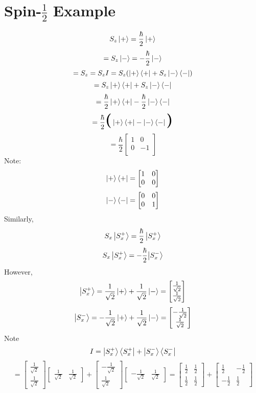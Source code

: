 \documentclass{book}
\begin{document}
\section{Spin-$\frac{1}{2}$ Example}
$$ S_z \ket{+} = \frac{\hbar}{2} \ket{+} $$
$$=  S_z \ket{-} = - \frac{\hbar}{2} \ket{-} $$
$$= S_z = S_z I = S_z (\ket{+}\bra{+} + S_z \ket{-}\bra{-}) $$
$$= S_z \ket{+} \bra{+} + S_z \ket {-} \bra{-} $$
$$= \frac{\hbar}{2} \ket{+}\bra{+} - \frac{\hbar}{2} \ket{-}\bra{-}$$
$$= \frac{\hbar}{2} \textbf{\huge (} \ket{+}\bra{+}  -  \ket{-}\bra{-} \textbf{\huge)}$$
$$= \frac{\hbar}{2} \begin{bmatrix}
 1 & 0 \\
 0 & -1 \\
\end{bmatrix}
$$
Note:
$$ \ket{+} \bra{+} = \begin{bmatrix}
 1 & 0 \\ 0 & 0
\end{bmatrix} $$
$$ \ket{-} \bra{-} = \begin{bmatrix}
 0 & 0 \\ 0 & 1
\end{bmatrix} $$
Similarly, 
$$ S_x \ket{S_x^+} = \frac{\hbar}{2}\ket{S_x^+} $$
$$ S_x \ket{S_x^+} = - \frac{\hbar}{2}{\ket{S_x^-}} $$
However, 
$$\ket{S_x^+} = \frac{1}{\sqrt{2}} \ket{+} + \frac{1}{\sqrt{2}} \ket{-} = \begin{bmatrix}
\frac{1}{\sqrt{2}} \\ \frac{1}{\sqrt{2}}
\end{bmatrix}$$
$$\ket{S_x^-} =- \frac{1}{\sqrt{2}} \ket{+} + \frac{1}{\sqrt{2}} \ket{-} = \begin{bmatrix}
- \frac{1}{\sqrt{2}} \\ \frac{1}{\sqrt{2}}
\end{bmatrix}$$
Note
$$ I = \ket{S_x^+} \bra{S_x^+} + \ket{S_x^-}\bra{S_x^-}$$
$$ = \begin{bmatrix}
  \frac{1}{\sqrt{2}} \\ \frac{1}{\sqrt{2}}
\end{bmatrix}
\begin{bmatrix}
  \frac{1}{\sqrt{2}} & \frac{1}{\sqrt{2}}
\end{bmatrix} +
 \begin{bmatrix}
  - \frac{1}{\sqrt{2}} \\ \frac{1}{\sqrt{2}}
\end{bmatrix}
\begin{bmatrix}
  - \frac{1}{\sqrt{2}} & \frac{1}{\sqrt{2}}
\end{bmatrix} = 
\begin{bmatrix}
  \frac{1}{2} &  \frac{1}{2} \\
   \frac{1}{2} &  \frac{1}{2}
\end{bmatrix} + 
\begin{bmatrix}
   \frac{1}{2} & - \frac{1}{2} \\
   -  \frac{1}{2} &  \frac{1}{2}
\end{bmatrix}
$$
\end{document}
